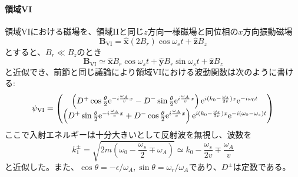 \paragraph{領域VI}
領域VIにおける磁場を、領域IIと同じ$z$方向一様磁場と同位相の$x$方向振動磁場
\begin{equation}
\bm{B}_\mathrm{VI}=\hat{\bm{x}}(2B_r)\cos\omega_s t +\hat{\bm{z}}B_z
\end{equation}
とすると、$B_r \ll B_z$のとき
\begin{equation}
\bm{B}_\mathrm{VI} \simeq \hat{\bm{x}} B_r\cos \omega_s t+\hat{\bm{y}} B_r \sin \omega_s t+\hat{\bm{z}} B_z
\end{equation}
と近似でき、前節と同じ議論により領域VIにおける波動関数は次のように書ける:
\begin{equation}
\psi_\mathrm{VI}=\begin{pmatrix} \left(D^+\cos\frac{\theta}{2} \mathrm{e}^{-i\frac{\omega_A}{v} x}-D^-\sin\frac{\theta}{2} \mathrm{e}^{i\frac{\omega_A}{v}x} \right) \mathrm{e}^{i(k_0-\frac{\omega_s}{2v})x} \mathrm{e}^{-i\omega_0 t} \\ \left(D^+\sin\frac{\theta}{2}\mathrm{e}^{-i\frac{\omega_A}{v} x}+D^-\cos\frac{\theta}{2}\mathrm{e}^{i\frac{\omega_A}{v} x}\right) \mathrm{e}^{i(k_0-\frac{\omega_s}{2v})x} \mathrm{e}^{-i(\omega_0-\omega_s) t} \end{pmatrix}
\end{equation}
ここで入射エネルギーは十分大きいとして反射波を無視し、波数を
\begin{equation}
k^\pm_1 =\sqrt{2m\left(\omega_0-\frac{\omega_s}{2}\mp\omega_A\right)} \simeq k_0 -\frac{\omega_s}{2v} \mp\frac{\omega_A}{v}
\end{equation}
と近似した。また、$\cos \theta = -\epsilon/\omega_A,\sin\theta=\omega_r/\omega_A$であり、$D^\pm$は定数である。

